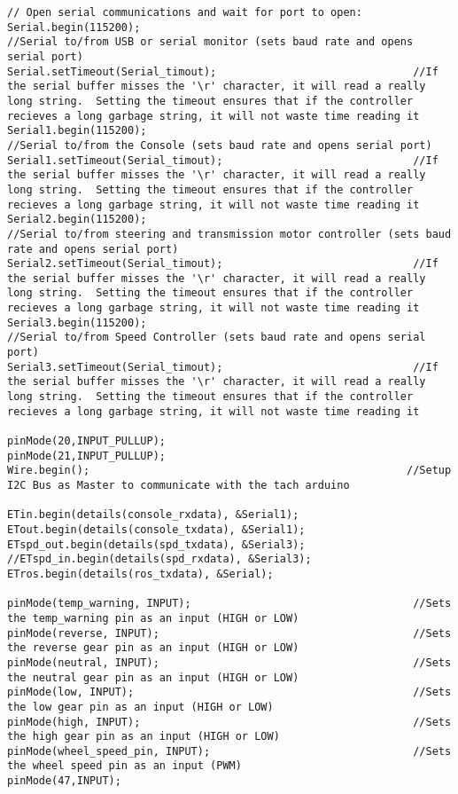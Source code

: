 \begin{lstlisting}[breaklines=true,basicstyle=\tiny]
// Open serial communications and wait for port to open:
Serial.begin(115200);                                             //Serial to/from USB or serial monitor (sets baud rate and opens serial port)
Serial.setTimeout(Serial_timout);                               //If the serial buffer misses the '\r' character, it will read a really long string.  Setting the timeout ensures that if the controller recieves a long garbage string, it will not waste time reading it
Serial1.begin(115200);                                            //Serial to/from the Console (sets baud rate and opens serial port)
Serial1.setTimeout(Serial_timout);                              //If the serial buffer misses the '\r' character, it will read a really long string.  Setting the timeout ensures that if the controller recieves a long garbage string, it will not waste time reading it
Serial2.begin(115200);                                          //Serial to/from steering and transmission motor controller (sets baud rate and opens serial port)
Serial2.setTimeout(Serial_timout);                              //If the serial buffer misses the '\r' character, it will read a really long string.  Setting the timeout ensures that if the controller recieves a long garbage string, it will not waste time reading it
Serial3.begin(115200);                                            //Serial to/from Speed Controller (sets baud rate and opens serial port)
Serial3.setTimeout(Serial_timout);                              //If the serial buffer misses the '\r' character, it will read a really long string.  Setting the timeout ensures that if the controller recieves a long garbage string, it will not waste time reading it

pinMode(20,INPUT_PULLUP);
pinMode(21,INPUT_PULLUP);
Wire.begin();                                                  //Setup I2C Bus as Master to communicate with the tach arduino

ETin.begin(details(console_rxdata), &Serial1);
ETout.begin(details(console_txdata), &Serial1);
ETspd_out.begin(details(spd_txdata), &Serial3);
//ETspd_in.begin(details(spd_rxdata), &Serial3);
ETros.begin(details(ros_txdata), &Serial);

pinMode(temp_warning, INPUT);                                   //Sets the temp_warning pin as an input (HIGH or LOW)
pinMode(reverse, INPUT);                                        //Sets the reverse gear pin as an input (HIGH or LOW)
pinMode(neutral, INPUT);                                        //Sets the neutral gear pin as an input (HIGH or LOW)
pinMode(low, INPUT);                                            //Sets the low gear pin as an input (HIGH or LOW)
pinMode(high, INPUT);                                           //Sets the high gear pin as an input (HIGH or LOW)
pinMode(wheel_speed_pin, INPUT);                                //Sets the wheel speed pin as an input (PWM)
pinMode(47,INPUT);


\end{lstlisting}
